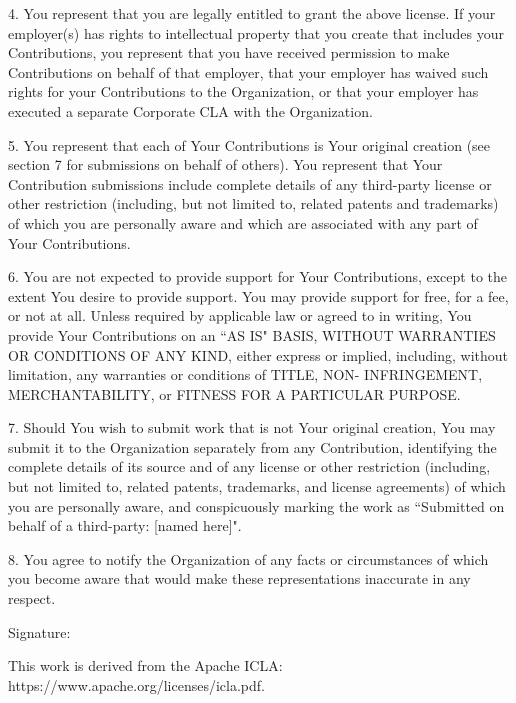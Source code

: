 \documentclass{article}
\begin{document}
4. You represent that you are legally entitled to grant the above
license. If your employer(s) has rights to intellectual property
that you create that includes your Contributions, you represent
that you have received permission to make Contributions on behalf
of that employer, that your employer has waived such rights for
your Contributions to the Organization, or that your employer has
executed a separate Corporate CLA with the Organization.

5. You represent that each of Your Contributions is Your original
creation (see section 7 for submissions on behalf of others). You
represent that Your Contribution submissions include complete
details of any third-party license or other restriction (including,
but not limited to, related patents and trademarks) of which you
are personally aware and which are associated with any part of Your
Contributions.

6. You are not expected to provide support for Your Contributions,
except to the extent You desire to provide support. You may provide
support for free, for a fee, or not at all. Unless required by
applicable law or agreed to in writing, You provide Your
Contributions on an “AS IS" BASIS, WITHOUT WARRANTIES OR CONDITIONS
OF ANY KIND, either express or implied, including, without
limitation, any warranties or conditions of TITLE, NON-
INFRINGEMENT, MERCHANTABILITY, or FITNESS FOR A PARTICULAR PURPOSE.

7. Should You wish to submit work that is not Your original creation,
You may submit it to the Organization separately from any
Contribution, identifying the complete details of its source and of
any license or other restriction (including, but not limited to,
related patents, trademarks, and license agreements) of which you
are personally aware, and conspicuously marking the work as
“Submitted on behalf of a third-party: [named here]".

8. You agree to notify the Organization of any facts or circumstances of
which you become aware that would make these representations
inaccurate in any respect.

Signature:

\begin{Form}
\end{Form}

This work is derived from the Apache ICLA: https://www.apache.org/licenses/icla.pdf.
\end{document}
